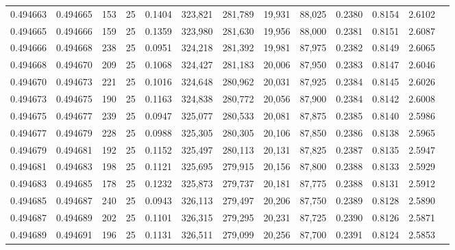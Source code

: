 \begin{tabular}{rrrrrrrrrrrrr}
0.494663 & 0.494665 &   153 &  25 &                                     0.1404 & 323,821 & 281,789 &  19,931 &  88,025 & 0.2380 & 0.8154 & 2.6102 \\
0.494665 & 0.494666 &   159 &  25 &                                     0.1359 & 323,980 & 281,630 &  19,956 &  88,000 & 0.2381 & 0.8151 & 2.6087 \\
0.494666 & 0.494668 &   238 &  25 &                                     0.0951 & 324,218 & 281,392 &  19,981 &  87,975 & 0.2382 & 0.8149 & 2.6065 \\
0.494668 & 0.494670 &   209 &  25 &                                     0.1068 & 324,427 & 281,183 &  20,006 &  87,950 & 0.2383 & 0.8147 & 2.6046 \\
0.494670 & 0.494673 &   221 &  25 &                                     0.1016 & 324,648 & 280,962 &  20,031 &  87,925 & 0.2384 & 0.8145 & 2.6026 \\
0.494673 & 0.494675 &   190 &  25 &                                     0.1163 & 324,838 & 280,772 &  20,056 &  87,900 & 0.2384 & 0.8142 & 2.6008 \\
0.494675 & 0.494677 &   239 &  25 &                                     0.0947 & 325,077 & 280,533 &  20,081 &  87,875 & 0.2385 & 0.8140 & 2.5986 \\
0.494677 & 0.494679 &   228 &  25 &                                     0.0988 & 325,305 & 280,305 &  20,106 &  87,850 & 0.2386 & 0.8138 & 2.5965 \\
0.494679 & 0.494681 &   192 &  25 &                                     0.1152 & 325,497 & 280,113 &  20,131 &  87,825 & 0.2387 & 0.8135 & 2.5947 \\
0.494681 & 0.494683 &   198 &  25 &                                     0.1121 & 325,695 & 279,915 &  20,156 &  87,800 & 0.2388 & 0.8133 & 2.5929 \\
0.494683 & 0.494685 &   178 &  25 &                                     0.1232 & 325,873 & 279,737 &  20,181 &  87,775 & 0.2388 & 0.8131 & 2.5912 \\
0.494685 & 0.494687 &   240 &  25 &                                     0.0943 & 326,113 & 279,497 &  20,206 &  87,750 & 0.2389 & 0.8128 & 2.5890 \\
0.494687 & 0.494689 &   202 &  25 &                                     0.1101 & 326,315 & 279,295 &  20,231 &  87,725 & 0.2390 & 0.8126 & 2.5871 \\
0.494689 & 0.494691 &   196 &  25 &                                     0.1131 & 326,511 & 279,099 &  20,256 &  87,700 & 0.2391 & 0.8124 & 2.5853 \\

\end{tabular}
